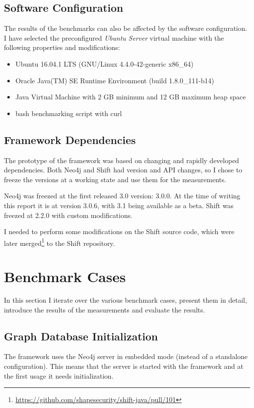 \subsection{Software Configuration}
The results of the benchmarks can also be affected by the software configuration. I have selected the preconfigured \emph{Ubuntu Server} virtual machine with the following properties and modifications:

\begin{itemize}[topsep=0pt]
  \item Ubuntu 16.04.1 LTS (GNU/Linux 4.4.0-42-generic x86\_64)
  \item Oracle Java(TM) SE Runtime Environment (build 1.8.0\_111-b14)
  \item Java Virtual Machine with 2 GB minimum and 12 GB maximum heap space
  \item bash benchmarking script with curl
\end{itemize}

\subsection{Framework Dependencies}
The prototype of the framework was based on changing and rapidly developed dependencies. Both Neo4j and Shift had version and API changes, so I chose to freeze the versions at a working state and use them for the measurements.

Neo4j was freezed at the first released 3.0 version: 3.0.0. At the time of writing this report it is at version 3.0.6, with 3.1 being available as a beta. Shift was freezed at 2.2.0 with custom modifications.

I needed to perform some modifications on the Shift source code, which were later merged\footnote{\small\url{https://github.com/shapesecurity/shift-java/pull/101}} to the Shift repository.


\section{Benchmark Cases}
In this section I iterate over the various benchmark cases, present them in detail, introduce the results of the measurements and evaluate the results.

\subsection{Graph Database Initialization}
The framework uses the Neo4j server in embedded mode (instead of a standalone configuration). This means that the server is started with the framework and at the first usage it needs initialization.

